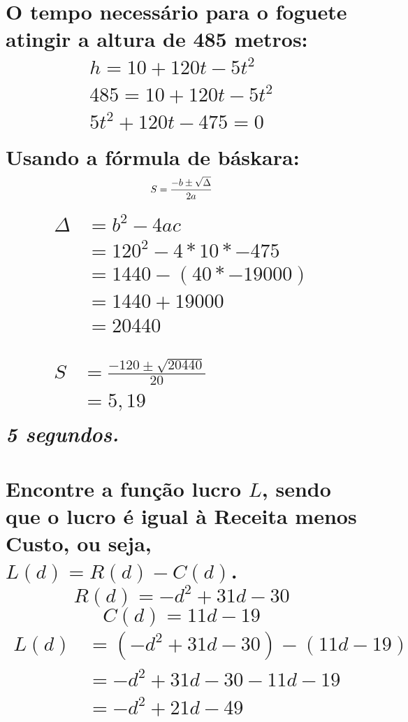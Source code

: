 \documentclass{jhwhw}
\begin{document}
\part{
	O tempo necessário para o foguete atingir a altura de 485 metros:
	\begin{gather*}
		h = 10 + 120t - 5t^2    \\
		485 = 10 + 120t - 5t^2 \\
		5t^2 + 120t - 475 = 0\\
	\end{gather*}
	Usando a fórmula de báskara:
	\begin{equation*}
		S = \frac{-b \pm \sqrt{\Delta}}{2a} \\
	\end{equation*}
	\begin{gather*}
		\begin{split}
			\Delta & = b^2-4ac            \\
			       & = 120^2 - 4*10*-475  \\
			       & = 1440 - (40*-19000) \\
			       & = 1440 + 19000       \\
			       & = 20440              \\
		\end{split}
		\\
		\begin{split}
			S & = \frac{-120 \pm \sqrt{20440}}{20} \\
			  & = 5, 19
		\end{split}
	\end{gather*}
	\emph{5 segundos.}
}
\part{
	Encontre a função lucro $L$, sendo que o lucro é igual à Receita menos Custo, ou seja, $L(d) = R(d) - C(d)$.
	\begin{equation*}
		R(d) = -d^2 + 31d-30
	\end{equation*}
	\begin{equation*}
		C(d) = 11d - 19
	\end{equation*}
	\begin{equation} \label{lucro}
		\begin{split}
			L(d) & = (-d^2 + 31d - 30) - (11d - 19) \\
			     & = -d^2 + 31d - 30 - 11d - 19     \\
			     & = -d^2 + 21d - 49                \\
		\end{split}
	\end{equation}
}
\end{document}
